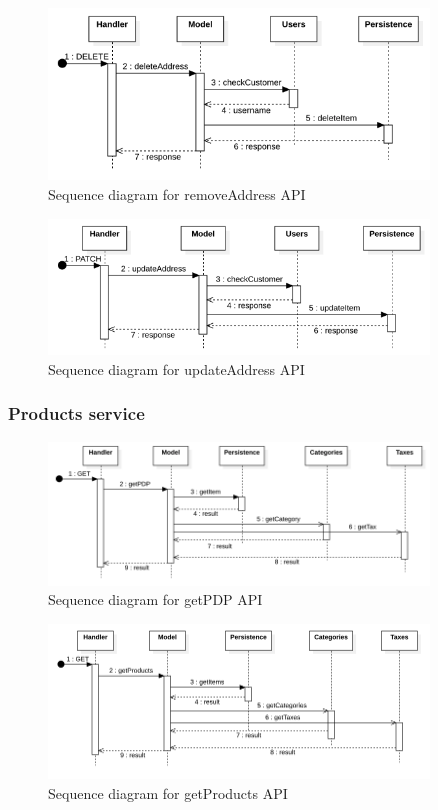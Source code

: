 \begin{figure}[H]
    \includegraphics[width=0.9\textwidth]{res/images/sequence-diagrams/addresses/removeAddress.png}
    \caption{Sequence diagram for removeAddress API}
\end{figure}

\begin{figure}[H]
    \includegraphics[width=0.9\textwidth]{res/images/sequence-diagrams/addresses/updateAddress.png}
    \caption{Sequence diagram for updateAddress API}
\end{figure}


\subsubsection{Products service}
\begin{figure}[H]
    \includegraphics[width=0.9\textwidth]{res/images/sequence-diagrams/products/getPDP.png}
    \caption{Sequence diagram for getPDP API}
\end{figure}


\begin{figure}[H]
    \includegraphics[width=0.9\textwidth]{res/images/sequence-diagrams/products/getProducts.png}
    \caption{Sequence diagram for getProducts API}
\end{figure}

